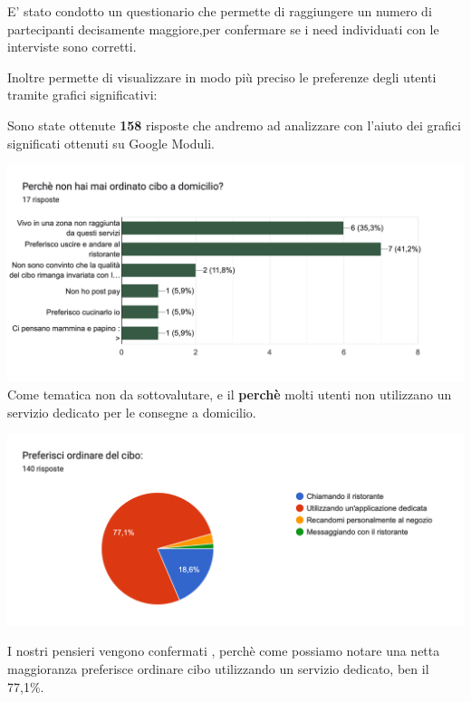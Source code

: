 \documentclass{article}
\begin{document}
    \vspace{1cm}
 
     \par 
\par E' stato condotto un questionario che permette di raggiungere un numero di partecipanti decisamente maggiore,per confermare se i need individuati con le interviste sono corretti.\par Inoltre permette di visualizzare in modo più preciso le preferenze degli utenti tramite grafici significativi:
\par \vspace{1cm}
Sono state ottenute \textbf{158} risposte che andremo ad analizzare con l'aiuto dei grafici significati ottenuti su Google Moduli.\par 
\includegraphics[width=\textwidth]{Data/Grafici/Perche_non_ordina.png}
Come tematica non da sottovalutare, e il \textbf{perchè} molti utenti non utilizzano un servizio dedicato per le consegne a domicilio.\vspace{1cm}\par
\includegraphics[width=\textwidth]{Data/Grafici/ordinare_cibo.png}\par
I nostri pensieri vengono confermati , perchè come possiamo notare una netta maggioranza preferisce ordinare cibo utilizzando un servizio dedicato, ben il 77,1\%.\par \vspace{1cm}
\end{document}
